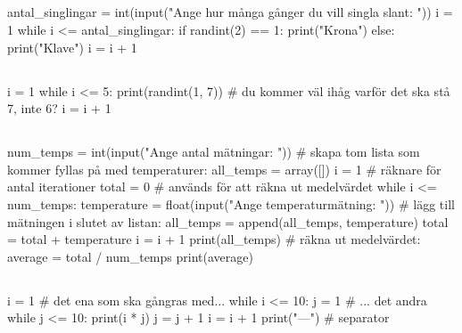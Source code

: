 \subsection*{}
\vspace{3pt}
\begin{python}
antal_singlingar = int(input("Ange hur många gånger du vill singla slant: "))
i = 1
while i <= antal_singlingar:
	if randint(2) == 1:
		print("Krona")
	else:
		print("Klave")
	i = i + 1
\end{python}

\subsection*{}
\vspace{3pt}
\begin{python}
i = 1
while i <= 5:
	print(randint(1, 7)) # du kommer väl ihåg varför det ska stå 7, inte 6?
	i = i + 1
\end{python}

\subsection*{}
\vspace{3pt}
\begin{python}
num_temps = int(input("Ange antal mätningar: "))
# skapa tom lista som kommer fyllas på med temperaturer:
all_temps = array([])
i = 1 # räknare för antal iterationer
total = 0 # används för att räkna ut medelvärdet
while i <= num_temps:
	temperature = float(input("Ange temperaturmätning: "))
	# lägg till mätningen i slutet av listan:
	all_temps = append(all_temps, temperature)
	total = total + temperature
	i = i + 1
print(all_temps)
# räkna ut medelvärdet:
average = total / num_temps
print(average)
\end{python}
\newpage
\subsection*{}
\vspace{3pt}
\begin{python}
i = 1 # det ena som ska gångras med...
while i <= 10:
	j = 1 # ... det andra
	while j <= 10:
		print(i * j)
		j = j + 1
	i = i + 1
	print("---") # separator
\end{python}

